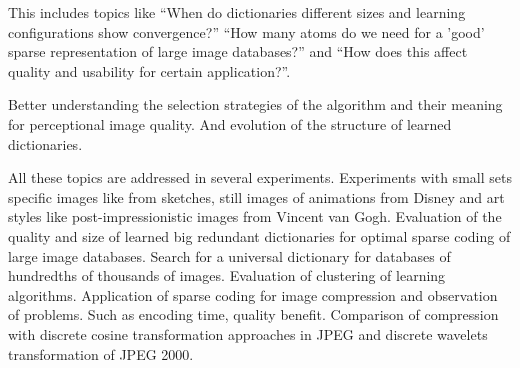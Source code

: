 This includes topics like ``When do dictionaries different sizes and
learning configurations show convergence?'' ``How many atoms do we need for a
'good' sparse representation of large image databases?''  and ``How does this
affect quality and usability for certain application?''. 

Better understanding the selection strategies of the algorithm and their
meaning for perceptional image quality. And evolution of the structure of
learned dictionaries. 

All these topics are addressed in several experiments. Experiments with
small sets specific images like from sketches, still images of animations from
Disney and art styles like post-impressionistic images from Vincent van Gogh.
Evaluation of the quality and size of learned big redundant dictionaries for
optimal sparse coding of large image databases. Search for a universal
dictionary for databases of hundredths of thousands of images. Evaluation of
clustering of learning algorithms. Application of sparse coding for image
compression and observation of problems. Such as encoding time, quality benefit.
Comparison of compression with discrete cosine transformation approaches in JPEG
and discrete wavelets transformation of JPEG 2000.







